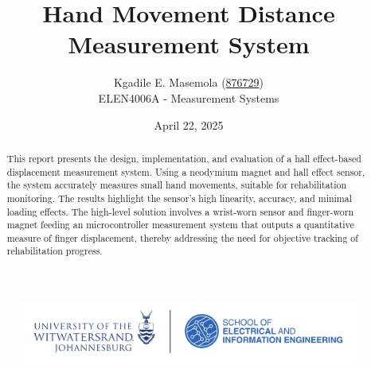 \documentclass[a4paper,12pt]{article}
\begin{document}
\begin{titlepage}
\begin{figure}
\centering
\includegraphics[scale=0.5]{witseie100logo.png}  
\end{figure}
\title{Hand Movement Distance Measurement System}
\author{Kgadile E. Masemola (\underline{876729})\\ ELEN4006A - Measurement Systems}
\date{April 22, 2025}
\maketitle
%
\begin{abstract}
This report presents the design, implementation, and evaluation of a hall effect-based displacement measurement system. Using a neodymium magnet and hall effect sensor, the system accurately measures small hand movements, suitable for rehabilitation monitoring. The results highlight the sensor's high linearity, accuracy, and minimal loading effects. The high-level solution involves a wrist-worn sensor and finger-worn magnet feeding an microcontroller measurement system that outputs a quantitative measure of finger displacement, thereby addressing the need for objective tracking of rehabilitation progress.
\end{abstract}
\end{titlepage}



%
\end{document}
